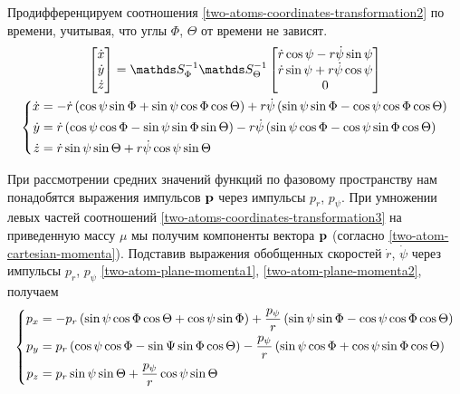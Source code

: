 Продифференцируем соотношения \eqref{two-atoms-coordinates-transformation2} по времени, учитывая, что углы $\Phi$, $\Theta$ от времени не зависят.
\begin{gather}
    \begin{bmatrix} \dot{x} \\ \dot{y} \\ \dot{z} \end{bmatrix} = 
    \bbS_\Phi^{-1} \bbS_\Theta^{-1}
    \begin{bmatrix} 
        \dot{r} \cos \psi - r \dot{\psi} \sin \psi \\
        \dot{r} \sin \psi + r \dot{\psi} \cos \psi \\
        0 
    \end{bmatrix} \\
    \lc
    \begin{aligned}
        \dot{x} &= - \dot{r} \lb \cos \psi \sin \Phi + \sin \psi \cos \Phi \cos \Theta \rb + r \dot{\psi} \lb \sin \psi \sin \Phi - \cos \psi \cos \Phi \cos \Theta \rb \\ 
        \dot{y} &= \dot{r} \lb \cos \psi \cos \Phi - \sin \psi \sin \Phi \sin \Theta \rb - r \dot{\psi} \lb \sin \psi \cos \Phi - \cos \psi \sin \Phi \cos \Theta \rb \\
        \dot{z} &= \dot{r} \sin \psi \sin \Theta + r \dot{\psi} \cos \psi \sin \Theta
    \end{aligned}
\right. \label{two-atoms-coordinates-transformation3}
\end{gather}

При рассмотрении средних значений функций по фазовому пространству нам понадобятся выражения импульсов $\mathbf{p}$ через импульсы $p_r$, $p_\psi$. При умножении левых частей соотношений \eqref{two-atoms-coordinates-transformation3} на приведенную массу $\mu$ мы получим компоненты вектора $\mathbf{p}$ (согласно \eqref{two-atom-cartesian-momenta}). Подставив выражения обобщенных скоростей $\dot{r}$, $\dot{\psi}$ через импульсы $p_r$, $p_\psi$ \eqref{two-atom-plane-momenta1}, \eqref{two-atom-plane-momenta2}, получаем
\begin{gather}
    \left\{
    \begin{aligned}
        p_x &= -p_r \left( \sin \psi \cos \Phi \cos \Theta + \cos \psi \sin \Phi \right) + \frac{p_\psi}{r} \left( \sin \psi \sin \Phi - \cos \psi \cos \Phi \cos \Theta \right) \\
        p_y &= p_r \left( \cos \psi \cos \Phi - \sin \Psi \sin \Phi \cos \Theta \right) - \frac{p_\psi}{r} \left( \sin \psi \cos \Phi + \cos \psi \sin \Phi \cos \Theta \right) \\
        p_z &= p_r \sin \psi \sin \Theta + \frac{p_\psi}{r} \cos \psi \sin \Theta 
    \end{aligned}
\right. \label{two-atom-momenta-transformation}
\end{gather}

